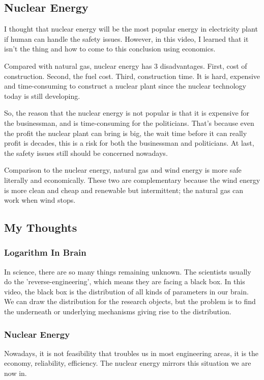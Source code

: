 \documentclass{article}
\begin{document}
\subsection{Nuclear Energy}
I thought that nuclear energy will be the most popular energy in electricity plant if human can handle the safety issues. However, in this video, I learned that it isn't the thing and how to come to this conclusion using economics.

Compared with natural gas, nuclear energy has 3 disadvantages. First, cost of construction. Second, the fuel cost. Third, construction time. It is hard, expensive and time-consuming to construct a nuclear plant since the nuclear technology today is still developing.

So, the reason that the nuclear energy is not popular is that it is expensive for the businessman, and is time-consuming for the politicians. That's because even the profit the nuclear plant can bring is big, the wait time before it can really profit is decades, this is a risk for both the businessman and politicians. At last, the safety issues still should be concerned nowadays.

Comparison to the nuclear energy, natural gas and wind energy is more safe literally and economically. These two are complementary because the wind energy is more clean and cheap and renewable but intermittent; the natural gas can work when wind stops.

\subsection{My Thoughts}
\subsubsection*{Logarithm In Brain}
In science, there are so many things remaining unknown. The scientists usually do the 'reverse-engineering', which means they are facing a black box. In this video, the black box is the distribution of all kinds of parameters in our brain. We can draw the distribution for the research objects, but the problem is to find the underneath or underlying mechanisms giving rise to the distribution.

\subsubsection*{Nuclear Energy}
Nowadays, it is not feasibility that troubles us in most engineering areas, it is the economy, reliability, efficiency. The nuclear energy mirrors this situation we are now in.
\end{document}
